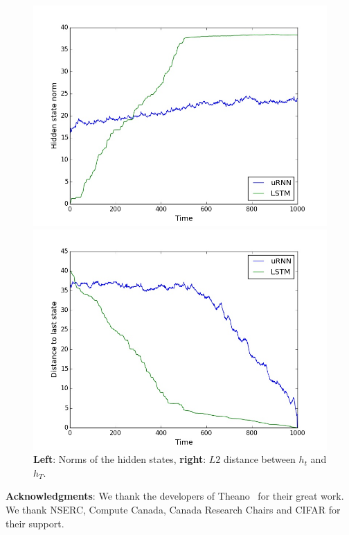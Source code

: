 \documentclass{article} %
\begin{document}
   




\begin{figure}[t!] 
\label{fig:saturation} 
\begin{minipage}[b]{0.5\linewidth}
  \centering
  \includegraphics[scale=0.25]{figures/hnorms.jpeg}
\end{minipage}%
\begin{minipage}[b]{0.5\linewidth}
  \centering
  \includegraphics[scale=0.25]{figures/hdiff.jpeg}
\end{minipage}
\caption{\textbf{Left}: Norms of the hidden states, \textbf{right}: $L2$ distance between $h_t$ and $h_T$.}
\end{figure}


{\bf Acknowledgments}: We thank the developers of
Theano~\cite{Fred2010} for %
their great work. We thank NSERC, Compute Canada, Canada Research Chairs and CIFAR for their support.



\end{document}
